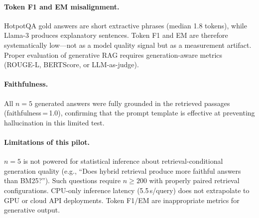 \documentclass[11pt,a4paper]{article}
\begin{document}
\paragraph{Token F1 and EM misalignment.}
HotpotQA gold answers are short extractive phrases (median 1.8 tokens), while
Llama-3 produces explanatory sentences.
Token F1 and EM are therefore systematically low---not as a model quality
signal but as a measurement artifact.
Proper evaluation of generative RAG requires generation-aware metrics
(ROUGE-L, BERTScore, or LLM-as-judge).

\paragraph{Faithfulness.}
All $n = 5$ generated answers were fully grounded in the retrieved passages
(faithfulness\,=\,1.0), confirming that the prompt template is effective at
preventing hallucination in this limited test.

\paragraph{Limitations of this pilot.}
$n = 5$ is not powered for statistical inference about retrieval-conditional
generation quality (e.g., ``Does hybrid retrieval produce more faithful answers
than BM25?'').
Such questions require $n \geq 200$ with properly paired retrieval
configurations.
CPU-only inference latency (5.5\,s/query) does not extrapolate to GPU or
cloud API deployments.
Token F1/EM are inappropriate metrics for generative output.
\end{document}
